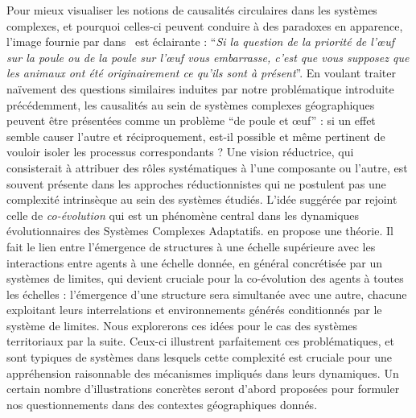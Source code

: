 {Pour mieux visualiser les notions de causalités circulaires dans les systèmes complexes, et pourquoi celles-ci peuvent conduire à des paradoxes en apparence, l'image fournie par  dans~\cite{diderot1965entretien} est éclairante : ``\textit{Si la question de la priorit{\'e} de l'\oe{}uf sur la poule ou de la poule sur l'\oe{}uf vous embarrasse, c'est que vous supposez que les animaux ont {\'e}t{\'e} originairement ce qu'ils sont {\`a} pr{\'e}sent}''. En voulant traiter naïvement des questions similaires induites par notre problématique introduite précédemment, les causalités au sein de systèmes complexes géographiques peuvent être présentées comme un problème ``de poule et {\oe}uf'' : si un effet semble causer l'autre et réciproquement, est-il possible et même pertinent de vouloir isoler les processus correspondants ? Une vision réductrice, qui consisterait à attribuer des rôles systématiques à l'une composante ou l'autre, est souvent présente dans les approches réductionnistes qui ne postulent pas une complexité intrinsèque au sein des systèmes étudiés. L'idée suggérée par  rejoint celle de \emph{co-évolution} qui est un phénomène central dans les dynamiques évolutionnaires des Systèmes Complexes Adaptatifs. \cite{holland2012signals} en propose une théorie. Il fait le lien entre l'émergence de structures à une échelle supérieure avec les interactions entre agents à une échelle donnée, en général concrétisée par un systèmes de limites, qui devient cruciale pour la co-évolution des agents à toutes les échelles : l'émergence d'une structure sera simultanée avec une autre, chacune exploitant leurs interrelations et environnements générés conditionnés par le système de limites. Nous explorerons ces idées pour le cas des systèmes territoriaux par la suite. Ceux-ci illustrent parfaitement ces problématiques, et sont typiques de systèmes dans lesquels cette complexité est cruciale pour une appréhension raisonnable des mécanismes impliqués dans leurs dynamiques. Un certain nombre d'illustrations concrètes seront d'abord proposées pour formuler nos questionnements dans des contextes géographiques donnés.
}



